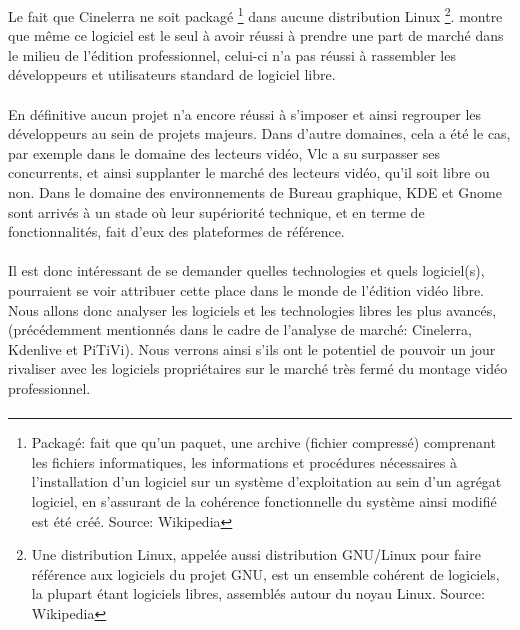 
Le fait que Cinelerra ne soit packagé \footnote{Packagé: fait
que qu'un paquet, une archive (fichier compressé) comprenant les
fichiers informatiques, les informations et procédures nécessaires
à l'installation d'un logiciel sur un système d'exploitation au sein
d'un agrégat logiciel, en s'assurant de la cohérence fonctionnelle
du système ainsi modifié est été créé. Source: Wikipedia} dans
aucune distribution Linux \footnote {Une distribution Linux, appelée
aussi distribution GNU/Linux pour faire référence aux logiciels du
projet GNU, est un ensemble cohérent de logiciels, la plupart étant
logiciels libres, assemblés autour du noyau Linux. Source: Wikipedia}.
montre que même ce logiciel est le seul à avoir réussi à prendre une
part de marché dans le milieu de l'édition professionnel, celui-ci n'a
pas réussi à rassembler les développeurs et utilisateurs standard de
logiciel libre.

\paragraph{}

En définitive aucun projet n'a encore réussi à s'imposer et ainsi
regrouper les développeurs au sein de projets majeurs. Dans d'autre
domaines, cela a été le cas, par exemple dans le domaine des lecteurs
vidéo, Vlc a su surpasser ses concurrents, et ainsi supplanter le
marché des lecteurs vidéo, qu'il soit libre ou non. Dans le domaine
des environnements de Bureau graphique, KDE et Gnome sont arrivés à un
stade où leur supériorité technique, et en terme de fonctionnalités,
fait d'eux des plateformes de référence.

\paragraph{}

Il est donc intéressant de se demander quelles technologies et quels
logiciel(s), pourraient se voir attribuer cette place dans le monde
de l'édition vidéo libre. Nous allons donc analyser les logiciels et
les technologies libres les plus avancés, (précédemment mentionnés
dans le cadre de l'analyse de marché: Cinelerra, Kdenlive et PiTiVi).
Nous verrons ainsi s'ils ont le potentiel de pouvoir un jour rivaliser
avec les logiciels propriétaires sur le marché très fermé du montage
vidéo professionnel.

\paragraph{}

